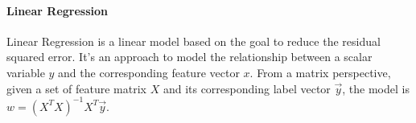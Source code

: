 \paragraph{Linear Regression}
Linear Regression is a linear model based on the goal to reduce the residual squared error. It's an approach to model the relationship between a scalar variable $y$ and the corresponding feature vector $x$. From a matrix perspective, given a set of feature matrix $X$ and its corresponding label vector $\vec{y}$, the model is $w = (X^{T}X)^{-1}X^{T}\vec{y}$.





